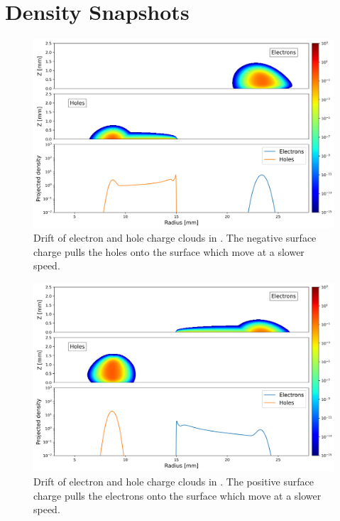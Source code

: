 \section{Density Snapshots}
\begin{figure}[!htb]
    \includegraphics[trim={0cm 0 0cm 0},clip,width=0.99\linewidth]{ch3/figs/drift_path_sc=-0.3.png}
    \caption{Drift of electron and hole charge clouds in {\tdsim}. The negative surface charge pulls the holes onto the surface which move at a slower speed.}
    \label{ch3:fig:ehd_path_pd_sc-0.3}
\end{figure}

\begin{figure}[!htb]
    \includegraphics[trim={0cm 0 0cm 0},clip,width=0.99\linewidth]{ch3/figs/drift_path_sc=0.3.png}
    \caption{Drift of electron and hole charge clouds in {\tdsim}. The positive surface charge pulls the electrons onto the surface which move at a slower speed.}
    \label{ch3:fig:ehd_path_pd_sc0.3}
\end{figure}

